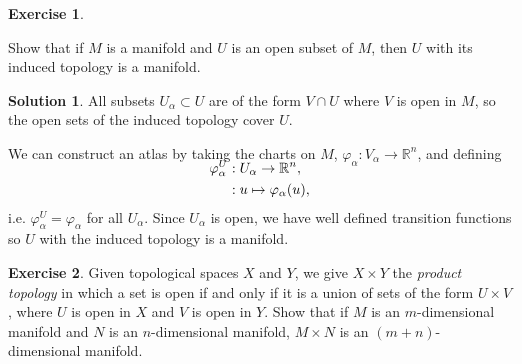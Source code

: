 \documentclass[11pt, a4paper]{report}
\theoremstyle{definition}
\newtheorem{exercise}{Exercise}[part]
\newtheorem{solution}{Solution}[part]
\newenvironment{ex}{\begin{exercise}}{\end{exercise}\pagebreak[1]}
\newenvironment{sol}{\begin{solution}}{\end{solution}\pagebreak[3]}
\begin{document}
\begin{ex}\label{ex:opensubsetismanifold}

Show that if $M$ is a manifold and $U$ is an open subset of $M$, then $U$ with its induced topology is a manifold.

\end{ex}

\begin{sol}

All subsets $U_\alpha \subset U$ are of the form $V \cap U$ where $V$ is open in $M$, so the open sets of the induced topology cover $U$.

We can construct an atlas by taking the charts on $M$, $\varphi_\alpha: V_\alpha \to \mathbb{R}^n$, and defining
\begin{align*}
    \SwapAboveDisplaySkip
    \varphi^U_\alpha&: U_\alpha \to \mathbb{R}^n, \\
                    &: u \mapsto \varphi_\alpha(u),
\end{align*}
i.e. $\varphi^U_\alpha = \varphi_\alpha$ for all $U_\alpha$.
Since $U_\alpha$ is open, we have well defined transition functions so $U$ with the induced topology is a manifold.

\end{sol}

\begin{ex}

Given topological spaces $X$ and $Y$, we give $X \times Y$ the \emph{product topology} in which a set is open if and only if it is a union of sets of the form $U \times V$, where $U$ is open in $X$ and $V$ is open in $Y$. Show that if $M$ is an $m$-dimensional manifold and $N$ is an $n$-dimensional manifold, $M \times N$ is an $(m + n)$-dimensional manifold.

\end{ex}
\end{document}

